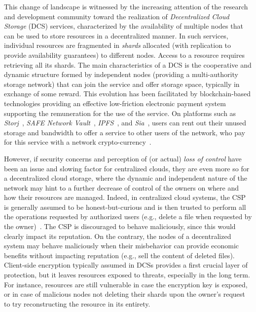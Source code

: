This change of landscape is witnessed by the increasing attention of
the research and development community toward the realization of {\em
  Decentralized Cloud Storage\/} (DCS) services, characterized by the
availability of multiple nodes that can be used to store resources in
a decentralized manner. In such services, individual resources are
fragmented in {\em shards\/} allocated (with replication to provide
availability guarantees) to different nodes.  Access to a resource
requires retrieving all its shards.  The main characteristics of a DCS
is the cooperative and dynamic structure formed by independent nodes
(providing a multi-authority storage network) that can join the
service and offer storage space, typically in exchange of some reward.
This evolution has been facilitated by blockchain-based technologies
providing an effective low-friction electronic payment system
supporting the remuneration for the use of the service.  On platforms
such as {\em Storj}~\cite{wilkinson2014storj}, {\em SAFE Network
  Vault}~\cite{irvine2010maidsafe,paul2014security}, {\em
  IPFS}~\cite{benet2014ipfs}, and {\em Sia}~\cite{vorick2014sia},
users can rent out their unused storage and bandwidth to offer a
service to other users of the network, who pay for this service with a
network crypto-currency~\cite{sc-distributed-content-delivery}.


However, if security concerns and perception of (or actual) {\em loss
  of control} have been an issue and slowing factor for centralized
clouds, they are even more so for a decentralized cloud storage, where
the dynamic and independent nature of the network may hint to a
further decrease of control of the owners on where and how their
resources are managed.  Indeed, in centralized cloud systems, the CSP
is generally assumed to be honest-but-curious and is then trusted to
perform all the operations requested by authorized users (e.g., delete
a file when requested by the owner)~\cite{hbcm02}. The CSP is
discouraged to behave maliciously, since this would clearly impact its
reputation. On the contrary, the nodes of a decentralized system may
behave maliciously when their misbehavior can provide economic
benefits without impacting reputation (e.g., sell the content of
deleted files).  Client-side encryption typically assumed in DCSs
provides a first crucial layer of protection, but it leaves resources
exposed to threats, especially in the long term.  For instance,
resources are still vulnerable in case the encryption key is exposed,
or in case of malicious nodes not deleting their shards upon the
owner's request to try reconstructing the resource in its entirety.


